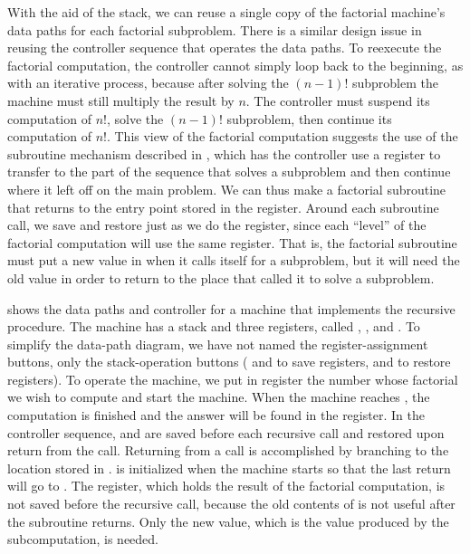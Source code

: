 With the aid of the stack, we can reuse a single copy of the factorial
machine's data paths for each factorial subproblem.  There is a similar design
issue in reusing the controller sequence that operates the data paths.  To
reexecute the factorial computation, the controller cannot simply loop back to
the beginning, as with an iterative process, because after solving the
\( (n - 1)! \) subproblem the machine must still multiply the result by \( n \).  The
controller must suspend its computation of \( n! \), solve the \( (n - 1)! \)
subproblem, then continue its computation of \( n! \).  This view of the
factorial computation suggests the use of the subroutine mechanism described in
, which has the controller use a  register to
transfer to the part of the sequence that solves a subproblem and then continue
where it left off on the main problem.  We can thus make a factorial subroutine
that returns to the entry point stored in the  register.  Around
each subroutine call, we save and restore  just as we do the
 register, since each ``level'' of the factorial computation will use
the same  register.  That is, the factorial subroutine must put
a new value in  when it calls itself for a subproblem, but it
will need the old value in order to return to the place that called it to solve
a subproblem.

 shows the data paths and controller for a machine that
implements the recursive  procedure.  The machine has a stack
and three registers, called , , and .  To
simplify the data-path diagram, we have not named the register-assignment
buttons, only the stack-operation buttons ( and  to save
registers,  and  to restore registers).  To operate the
machine, we put in register  the number whose factorial we wish to
compute and start the machine.  When the machine reaches , the
computation is finished and the answer will be found in the 
register.  In the controller sequence,  and  are saved
before each recursive call and restored upon return from the call.  Returning
from a call is accomplished by branching to the location stored in
.   is initialized when the machine starts so
that the last return will go to .  The  register,
which holds the result of the factorial computation, is not saved before the
recursive call, because the old contents of  is not useful after the
subroutine returns.  Only the new value, which is the value produced by the
subcomputation, is needed.

